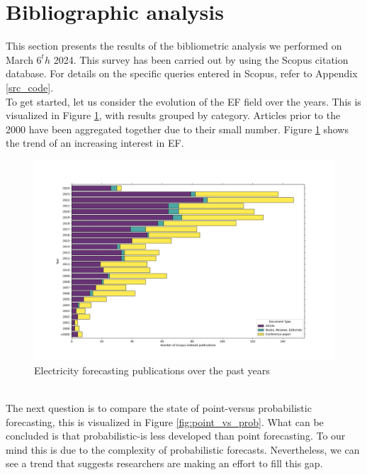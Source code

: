 \section{Bibliographic analysis}
This section presents the results of the bibliometric analysis we performed on March $6^th$ 2024. This survey has been carried out by using the Scopus citation database. For details on the specific queries entered in Scopus, refer to Appendix \ref{src_code}.
\\
To get started, let us consider the evolution of the EF field over the years. This is visualized in Figure \ref{fig:epf_evolution}, with results grouped by category. Articles prior to the 2000 have been aggregated together due to their small number. Figure \ref{fig:epf_evolution} shows the trend of an increasing interest in EF.
\begin{figure}
    \includegraphics[width=\textwidth]{images/epf_evolution1.jpg}
    \caption{Electricity forecasting publications over the past years}
    \label{fig:epf_evolution}
  \end{figure}
\\
The next question is to compare the state of point-versus probabilistic forecasting, this is visualized in Figure \ref{fig:point_vs_prob}. What can be concluded is that probabilistic-is less developed than point forecasting. To our mind this is due to the complexity of probabilistic forecasts.
Nevertheless, we can see a trend that suggests researchers are making an effort to fill this gap.
